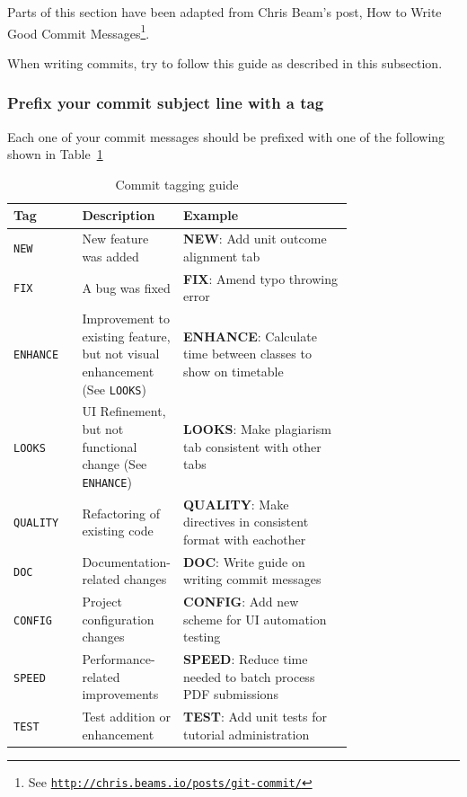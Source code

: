 \documentclass[12pt,a4paper,]{article}
\renewcommand{\href}[2]{#2\footnote{See \texttt{\url{#1}}}}
\begin{document}
Parts of this section have been adapted from Chris Beam's post,
\href{http://chris.beams.io/posts/git-commit/}{How to Write Good Commit
Messages}.

When writing commits, try to follow this guide as described in this subsection.

\hypertarget{prefix-your-commit-subject-line-with-a-tag}{\subsubsection{Prefix
your commit subject line with a
tag}\label{prefix-your-commit-subject-line-with-a-tag}}

Each one of your commit messages should be prefixed with one of the
following shown in Table~\ref{tab:tags}

\begin{table}
\centering
\caption{Commit tagging guide}
\label{tab:tags}
\vspace{1em}
\begin{tabular}{@{}lp{0.25\linewidth}p{0.5\linewidth}@{}}
\toprule
Tag       & Description                                                             & Example                                                      \\ \midrule
\texttt{NEW}       & New feature was added                                                   & \textbf{NEW}: Add unit outcome alignment tab                          \\
\texttt{​FIX}      & A bug was fixed                                                         & \textbf{FIX}: Amend typo throwing error                               \\
\texttt{​​ENHANCE} & Improvement to existing feature, but not visual enhancement (See \texttt{LOOKS}) & \textbf{ENHANCE}: Calculate time between classes to show on timetable \\
\texttt{​LOOKS}    & UI Refinement, but not functional change (See \texttt{ENHANCE})                  & \textbf{LOOKS}: Make plagiarism tab consistent with other tabs        \\
\texttt{​QUALITY}  & Refactoring of existing code                                            & \textbf{QUALITY}: Make directives in consistent format with eachother \\
\texttt{​DOC}      & Documentation-related changes                                           & \textbf{DOC}: Write guide on writing commit messages                  \\
\texttt{CONFIG}    & Project configuration changes                                           & \textbf{CONFIG}: Add new scheme for UI automation testing             \\
\texttt{​SPEED}    & Performance-related improvements                                        & \textbf{SPEED}: Reduce time needed to batch process PDF submissions   \\
\texttt{TEST}      & Test addition or enhancement                                            & \textbf{TEST}: Add unit tests for tutorial administration             \\ \bottomrule
\end{tabular}
\end{table}
\end{document}
